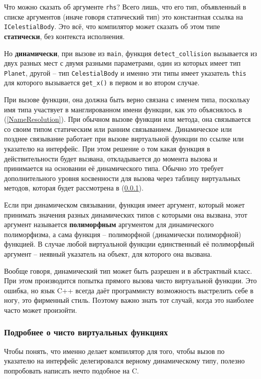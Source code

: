 \documentclass[a4paper,12pt,oneside]{article}
\begin{document}
Что можно сказать об аргументе \lstinline!rhs!? Всего лишь, что его тип, объявленный в списке аргументов (иначе говоря статический тип) это константная ссылка на \lstinline!ICelestialBody!. Это всё, что компилятор может сказать об этом типе \textbf{статически}, без контекста исполнения.

Но \textbf{динамически}, при вызове из \lstinline!main!, функция \lstinline!detect_collision! вызывается из двух разных мест с двумя разными параметрами, один из которых имеет тип \lstinline!Planet!, другой – тип \lstinline!CelestialBody! и именно эти типы имеет указатель \lstinline!this! для которого вызывается \lstinline!get_x()! в первом и во втором случае.

При вызове функции, она должна быть верно связана с именем типа, поскольку имя типа участвует в манглированном имени функции, как это объяснялось в (\ref{NameResolution}). При обычном вызове функции или метода, она связывается со своим типом статическим или ранним связыванием. Динамическое или позднее связывание работает при вызове виртуальной функции по ссылке или указателю на интерфейс. При этом решение о том какая функция в действительности будет вызвана, откладывается до момента вызова и принимается на основании её динамического типа. Обычно это требует дополнительного уровня косвенности для вызова через таблицу виртуальных методов, которая будет рассмотрена в (\ref{VirtualUnderHood}).

Если при динамическом связывании, функция имеет аргумент, который может принимать значения разных динамических типов с которыми она вызвана, этот аргумент называется \textbf{полиморфным} аргументом для динамического полиморфизма, а сама функция -- полиморфной (динамически полиморфной) функцией. В случае любой виртуальной функции единственный её полиморфный аргумент -- неявный указатель на объект, для которого она вызвана.

Вообще говоря, динамический тип может быть разрешен и в абстрактный класс. При этом производится попытка прямого вызова чисто виртуальной функции. Это ошибка, но язык C++ всегда даёт программисту возможность выстрелить себе в ногу, это фирменный стиль. Поэтому важно знать тот случай, когда это наиболее часто может произойти.

\subsubsection{Подробнее о чисто виртуальных функциях}\label{VirtualUnderHood}

Чтобы понять, что именно делает компилятор для того, чтобы вызов по указателю на интерфейс делегировался верному динамическому типу, полезно попробовать написать нечто подобное на C.
\end{document}
